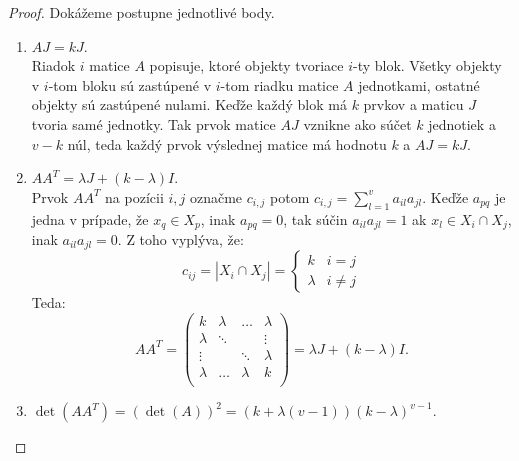 \begin{proof}
Dokážeme postupne jednotlivé body.
\begin{enumerate}
	\item $A J = k J$. \label{itemA} \\
	Riadok $i$ matice $A$ popisuje, ktoré objekty tvoriace $i$-ty blok. Všetky objekty v $i$-tom bloku sú zastúpené v $i$-tom riadku matice $A$ jednotkami, ostatné objekty sú zastúpené nulami. Keďže každý blok má $k$ prvkov a maticu $J$ tvoria samé jednotky. Tak prvok matice $A J$ vznikne ako súčet $k$ jednotiek a $v - k$ núl, teda každý prvok výslednej matice má hodnotu $k$ a $A J = k J$.

	\item $A A^T = \lambda J + (k - \lambda) I$. \label{itemB} \\
	Prvok $A A^T$ na pozícii $i, j$ označme $c_{i,j}$ potom $c_{i,j} = \sum\limits_{l=1}^{v} a_{il} a_{jl}$. Keďže $a_{pq}$ je jedna v prípade, že $x_q \in X_p$, inak $a_{pq} = 0$, tak súčin $a_{il} a_{jl} = 1$ ak $x_l \in X_i \cap X_j$, inak $a_{il} a_{jl} = 0$. Z toho vyplýva, že:
	\begin{equation*}
		c_{ij} = |X_i \cap X_j| = \begin{cases}
					k               & i = j\\
					\lambda         & i \neq j
				\end{cases}
	\end{equation*}
	Teda:
	\begin{equation*}
		A A^T = 
		\begin{pmatrix}
		k & \lambda & \dots & \lambda \\
		\lambda & \ddots & & \vdots \\
		\vdots &  & \ddots & \lambda \\
		\lambda & \dots & \lambda & k \\
		\end{pmatrix} =  \lambda J + (k - \lambda) I.
	\end{equation*}

	\item $\det(A A^T) = (\det(A))^2 = (k + \lambda (v - 1)) (k - \lambda)^{v-1}$. \label{itemC} \\


\end{enumerate}
\end{proof}
